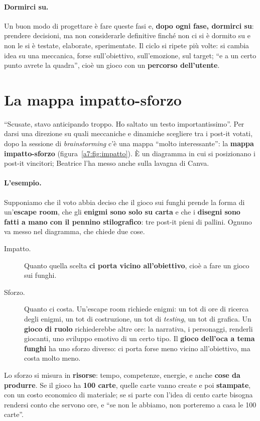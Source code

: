 \paragraph{Dormirci su.} Un buon modo di progettare è fare queste fasi e,
\textbf{dopo ogni fase, dormirci su}: prendere decisioni, ma non considerarle
definitive finché non ci si è dormito su e non le si è testate, elaborate,
sperimentate. Il ciclo si ripete più volte: si cambia idea su una meccanica, forse
sull'obiettivo, sull'emozione, sul target; ``e a un certo punto avrete la quadra'',
cioè un gioco con un \textbf{percorso dell'utente}.

\section{La mappa impatto-sforzo}
\label{a7:sec:impatto}



``Scusate, stavo anticipando troppo. Ho saltato un testo importantissimo''. Per darsi
una direzione su quali meccaniche e dinamiche scegliere tra i post-it votati, dopo la
sessione di \emph{brainstorming} c'è una mappa ``molto interessante'': la
\textbf{mappa impatto-sforzo} (figura~\ref{a7:fig:impatto}). È un diagramma in cui si
posizionano i post-it vincitori; Beatrice l'ha messo anche sulla lavagna di Canva.

\paragraph{L'esempio.} Supponiamo che il voto abbia deciso che il gioco sui funghi
prende la forma di un'\textbf{escape room}, che gli \textbf{enigmi sono solo su
carta} e che i \textbf{disegni sono fatti a mano con il pennino stilografico}: tre
post-it pieni di pallini. Ognuno va messo nel diagramma, che chiede due cose.
\begin{description}
  \item[Impatto.] Quanto quella scelta \textbf{ci porta vicino all'obiettivo}, cioè a
        fare un gioco sui funghi.
  \item[Sforzo.] Quanto ci costa. Un'escape room richiede enigmi: un tot di ore di
        ricerca degli enigmi, un tot di costruzione, un tot di \emph{testing}, un tot
        di grafica. Un \textbf{gioco di ruolo} richiederebbe altre ore: la narrativa,
        i personaggi, renderli giocanti, uno sviluppo emotivo di un certo tipo. Il
        \textbf{gioco dell'oca a tema funghi} ha uno sforzo diverso: ci porta forse
        meno vicino all'obiettivo, ma costa molto meno.
\end{description}
Lo sforzo si misura in \textbf{risorse}: tempo, competenze, energie, e anche
\textbf{cose da produrre}. Se il gioco ha \textbf{100 carte}, quelle carte vanno create
e poi \textbf{stampate}, con un costo economico di materiale; se si parte con l'idea
di cento carte bisogna rendersi conto che servono ore, e ``se non le abbiamo, non
porteremo a casa le 100 carte''.

